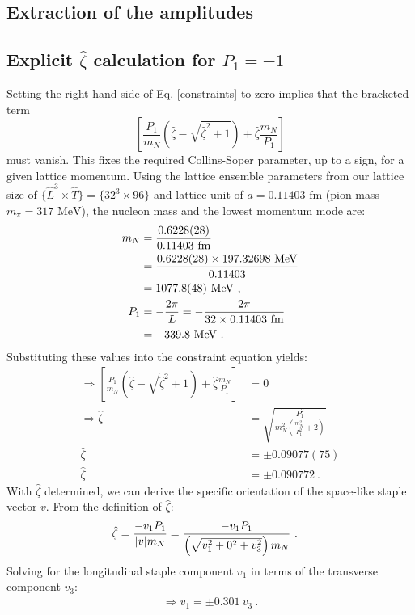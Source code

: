 \begin{widetext}

\section{Extraction of the amplitudes}
\label{app:extraction}
\subsection{Explicit $\hat\zeta$ calculation for $P_1=-1$}
\label{app:explicit_zeta}
Setting the right-hand side of Eq. \eqref{constraints} to zero implies that the bracketed term
\begin{equation*}
\left[\frac{P_{1}}{m_{N}}\left(\hat{\zeta}-\sqrt{\hat{\zeta}^2+1}\right)+\hat{\zeta}\frac{m_{N}}{P_{1}}\right]
\end{equation*}
must vanish. This fixes the required Collins-Soper parameter, up to a sign, for a given lattice momentum. Using the lattice ensemble parameters from our lattice size of $\{\hat{L}^3\times\hat{T}\}=\{32^3\times96\}$ and lattice unit of $a=0.11403\text{ fm}$ (pion mass $m_\pi=317\text{ MeV}$), the nucleon mass and the lowest momentum mode are:
\begin{align}
    m_N &= \frac{0.6228(28)}{0.11403\text{ fm}} \nonumber \\
    &= \frac{0.6228(28)\times 197.32698 \text{ MeV}}{0.11403} \nonumber \\
    &= 1077.8(48)\text{ MeV} \ , \\
    P_{1}&=-\frac{2\pi}{L}=-\frac{2\pi}{32\times 0.11403\text{ fm}} \nonumber \\
    &=-339.8\text{ MeV} \ .
\end{align}
Substituting these values into the constraint equation yields:
\begin{align}
   \Longrightarrow \left[\frac{P_{1}}{m_{N}}\left(\hat{\zeta}-\sqrt{\hat{\zeta}^2+1}\right)+\hat{\zeta}\frac{m_{N}}{P_{1}}\right]&=0 \nonumber \\
    \Longrightarrow \hat{\zeta} &=\sqrt{\frac{P_{1}^2}{m_{N}^{2}\left(\frac{m_{N}^{2}}{P_{1}^{2}}+2\right)}} \nonumber \\
    \hat{\zeta} &= \pm 0.09077(75) \nonumber \\
    \hat{\zeta} &= \pm 0.090772 \ .
\end{align}
With $\hat{\zeta}$ determined, we can derive the specific orientation of the space-like staple vector $v$. From the definition of $\hat{\zeta}$:
\begin{align}
    \hat{\zeta}&=\frac{-v_{1}P_{1}}{|v|m_N}=\frac{-v_{1}P_{1}}{\left(\sqrt{v_{1}^{2}+0^{2}+v_{3}^{2}}\right)m_{N}} \ .
\end{align}
Solving for the longitudinal staple component $v_1$ in terms of the transverse component $v_3$:
\begin{align}
    \Longrightarrow v_{1}=\pm 0.301~v_{3} \ .
\end{align}


\end{widetext}
